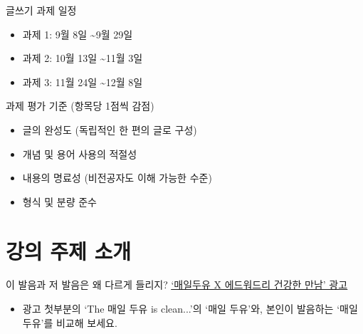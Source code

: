 \documentclass[11pt, aspectratio=169]{beamer}
\begin{document}
\begin{frame}[t]{}

    \begin{block}{글쓰기 과제 일정}
        \begin{itemize}
          \item 과제 1: 9월 8일 \textasciitilde 9월 29일
          \item 과제 2: 10월 13일 \textasciitilde 11월 3일
          \item 과제 3: 11월 24일 \textasciitilde 12월 8일
        \end{itemize}      
    \end{block}  

  \begin{block}{과제 평가 기준 (항목당 1점씩 감점)}
    \begin{itemize}
      \item 글의 완성도 (독립적인 한 편의 글로 구성)
      \item 개념 및 용어 사용의 적절성
      \item 내용의 명료성 (비전공자도 이해 가능한 수준)
      \item 형식 및 분량 준수
    \end{itemize}
  \end{block}

\end{frame}

\section{강의 주제 소개}

\begin{frame}[t]{}
  \begin{block}{이 발음과 저 발음은 왜 다르게 들리지?}
    \href{https://youtube.com/watch?v=dVKh6fSxbkE}{\underline{‘매일두유 X 에드워드리 건강한 만남’ 광고}}
    \begin{itemize}
      \item 광고 첫부분의 ‘The 매일 두유 is clean...’의 ‘매일 두유’와, 본인이 발음하는 ‘매일 두유’를 비교해 보세요.
    \end{itemize}
  \end{block}
\end{frame}
\end{document}
